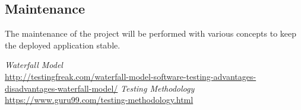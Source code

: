\documentclass[12pt]{article}
\begin{document}
\begin{myspace}{1.7}
\section*{Maintenance}  
	The maintenance of the project will be performed with various concepts to keep the deployed application stable. 




%
%
\pagebreak
\begin{thebibliography}{9}
   \textit{Waterfall Model}\\
   \url{http://testingfreak.com/waterfall-model-software-testing-advantages-disadvantages-waterfall-model/}
   \textit{Testing Methodology}\\
   \url{https://www.guru99.com/testing-methodology.html}
\end{thebibliography}
  
\end{myspace}
\end{document}
